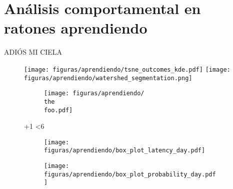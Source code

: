 \chapter{Análisis comportamental en ratones aprendiendo}

ADIÓS MI CIELA

\begin{figure}
    \centering
    \texttt{[image: figuras/aprendiendo/tsne\_outcomes\_kde.pdf]}
    \texttt{[image: figuras/aprendiendo/watershed\_segmentation.png]}
\end{figure}

\begin{figure}[!htbp]
    \begin{center}
        \newcount\foo
        \loop
        {\begin{subfigure}{.19\textwidth}
            \texttt{[image: figuras/aprendiendo/\\the\\foo.pdf]}
        \end{subfigure}}
        \advance \foo+1
        \ifnum \foo<6
        \repeat
    \end{center}
\end{figure}

\begin{figure}[!htbp]
    \centering
    \begin{subfigure}{.31\textwidth}
        \vspace{4ex}
        \texttt{[image: figuras/aprendiendo/box\_plot\_latency\_day.pdf]}
    \end{subfigure}
    \begin{subfigure}{.68\textwidth}
        \texttt{[image: figuras/aprendiendo/box\_plot\_probability\_day.pdf]}
    \end{subfigure}
\end{figure}